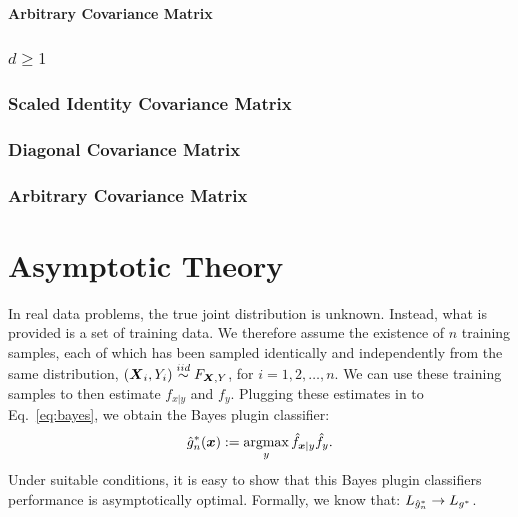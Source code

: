 \documentclass[10pt]{article}
\begin{document}
\paragraph{Arbitrary Covariance Matrix}


\subsubsection{$d \geq 1$}
\subsubsection{Scaled Identity Covariance Matrix}
\subsubsection{Diagonal Covariance Matrix}
\subsubsection{Arbitrary Covariance Matrix}




\newpage
\section{Asymptotic Theory}

In real data problems,  the true joint distribution is unknown. Instead, what is provided is a set of training data.  We therefore assume the existence of $n$ training samples, each of which has been sampled identically and independently from the same distribution, $(\boldsymbol{X}_i,Y_i) \overset{iid}{\sim} F_{\boldsymbol{X},Y}$, for $i =1,2,\ldots, n$.  We can use these training samples to then estimate $f_{x|y}$ and $f_y$.  Plugging these estimates in to Eq.~\eqref{eq:bayes}, we obtain the Bayes plugin classifier:
\begin{align} \label{eq:plugin}
\mh{g}^*_n(\bx) := \argmax_y \mh{f}_{\bx|y}\mh{f}_y.
\end{align}
Under suitable conditions, it is easy to show that this Bayes plugin classifiers performance is asymptotically optimal.
Formally, we know that:
$L_{\hat{g}^*_n} \rightarrow L_{g^*}$.
\end{document}

